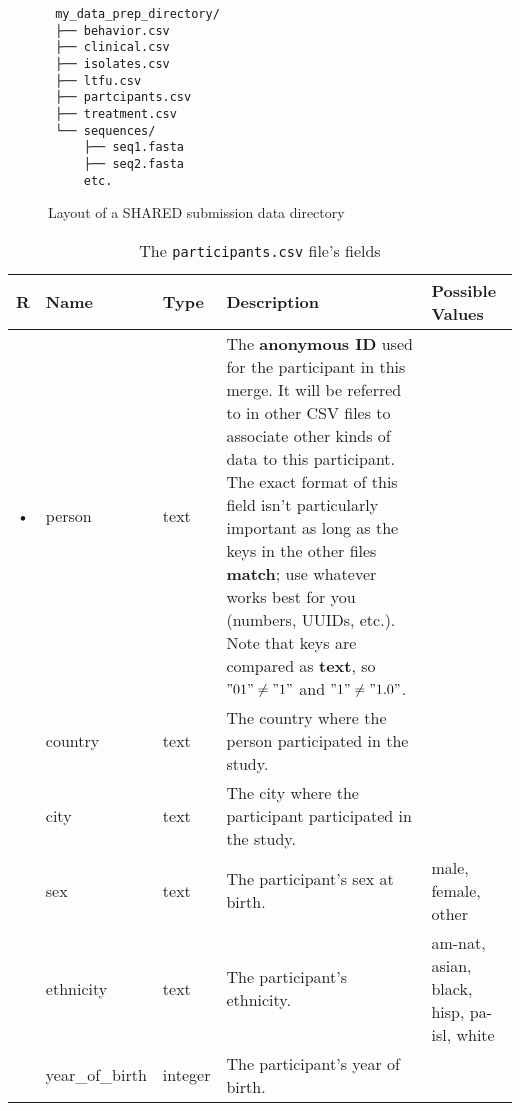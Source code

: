 \documentclass{article}
\begin{document}


\begin{figure}
  \caption{Layout of a SHARED submission data directory}
  \label{fig:data-prep-dir}
\begin{verbatim}
 my_data_prep_directory/
 ├── behavior.csv
 ├── clinical.csv
 ├── isolates.csv
 ├── ltfu.csv
 ├── partcipants.csv
 ├── treatment.csv
 └── sequences/
     ├── seq1.fasta
     ├── seq2.fasta
     etc.
\end{verbatim}
\end{figure}


\begin{table}[h!]
  \centering
  \caption{The \texttt{participants.csv} file's fields}
  \label{tbl:participants.csv}
  \begin{tabular}{cllp{6cm}p{4cm}}
    R & Name            & Type      & Description & Possible Values\\ \hline
    • & person          & text    &
      The \textbf{anonymous ID} used for the participant in this
      merge. It will be referred to in other CSV files to associate
      other kinds of data to this participant. The exact format of
      this field isn't particularly important as long as the keys in
      the other files \textbf{match}; use whatever works best for you
      (numbers, UUIDs, etc.). Note that keys are compared as
      \textbf{text}, so $"01" \neq "1"$ and $"1" \neq "1.0"$. 
      \\
      & country         & text    & The country where the person participated in the study. \\
      & city            & text    & The city where the participant participated in the study. \\
      & sex             & text    & The participant's sex at birth.  & male, female, other \\
      & ethnicity       & text    & The participant's ethnicity. & am-nat, asian, black, hisp, pa-isl, white \\
      & year\_of\_birth & integer   & The participant's year of birth. \\
  \end{tabular}
\end{table}
\end{document}

